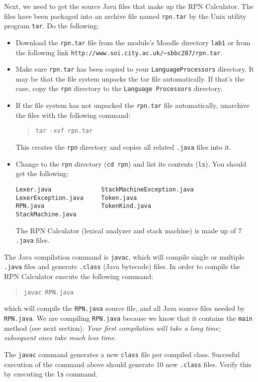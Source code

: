 \documentclass{article}
\newcommand{\fname}[1]{\texttt{#1}}
\begin{document}
Next, we need to get the source Java files that make up the RPN Calculator. The files have been packaged into an archive file named {\tt rpn.tar} by the Unix utility program {\tt tar}. Do the following:
\begin{itemize}
\item Download the {\tt rpn.tar} file from the module's Moodle directory \fname{lab1} or from the following link \verb+http://www.soi.city.ac.uk/~sbbc287/rpn.tar+.
\item Make sure {\tt rpn.tar} has been copied to your {\tt LanguageProcessors} directory. It may be that the file system unpacks the tar file automatically. If that's the case, copy the {\tt rpn} directory to the {\tt Language Processors} directory.
\item If the file system has not unpacked the {\tt rpn.tar} file automatically, unarchive the files with the following command:
\begin{quote}
{\tt tar -xvf rpn.tar}
\end{quote}
This creates the {\tt rpn} directory and copies all related {\tt .java} files into it. 
\item Change to the {\tt rpn} directory ({\tt cd rpn}) and list its contents ({\tt ls}). You should get the following:

\begin{verbatim}
Lexer.java              StackMachineException.java
LexerException.java     Token.java
RPN.java                TokenKind.java
StackMachine.java  
\end{verbatim}

The RPN Calculator (lexical analyzer and stack machine) is made up of 7 {\tt .java} files. 
\end{itemize}

The Java compilation command is {\tt javac}, which will compile single or multiple {\tt .java} files and generate {\tt .class} (Java bytecode) files. In order to compile the RPN Calculator execute the following command:

\begin{quote}
{\tt javac RPN.java}
\end{quote}

which will compile the {\tt RPN.java} source file, and all Java source files needed by {\tt RPN.java}. We are compiling {\tt RPN.java} because we know that it contains the {\tt main} method (see next section). 
\emph{Your first compilation will take a long time; subsequent ones take much less time.} 

The {\tt javac} command generates a new {\tt class} file per compiled class.
Succesful execution of the command above should generate 10 new {\tt .class} files. Verify this by executing the {\tt ls} command.
\end{document}
